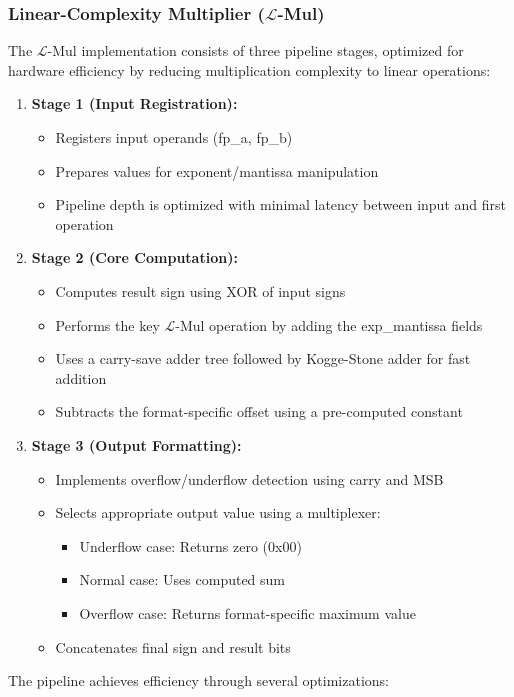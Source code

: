 \documentclass[12pt,letterpaper]{article}
\newcommand{\lmul}{$\mathcal{L}$-Mul\xspace}
\begin{document}
\subsubsection{Linear-Complexity Multiplier (\lmul)}

The \lmul implementation consists of three pipeline stages, optimized for hardware efficiency by reducing multiplication complexity to linear operations:

\begin{enumerate}
    \item \textbf{Stage 1 (Input Registration): }
    \begin{itemize}
        \item Registers input operands (fp\_a, fp\_b)
        \item Prepares values for exponent/mantissa manipulation
        \item Pipeline depth is optimized with minimal latency between input and first operation
    \end{itemize}
    \item \textbf{Stage 2 (Core Computation): }
    \begin{itemize}
        \item Computes result sign using XOR of input signs
        \item Performs the key \lmul operation by adding the exp\_mantissa fields
        \item Uses a carry-save adder tree followed by Kogge-Stone adder for fast addition
        \item Subtracts the format-specific offset using a pre-computed constant
    \end{itemize}
    \item \textbf{Stage 3 (Output Formatting): }
    \begin{itemize}
        \item Implements overflow/underflow detection using carry and MSB
        \item Selects appropriate output value using a multiplexer: 
        \begin{itemize}
            \item Underflow case: Returns zero (0x00)
            \item Normal case: Uses computed sum
            \item Overflow case: Returns format-specific maximum value
        \end{itemize}
        \item Concatenates final sign and result bits
    \end{itemize}
\end{enumerate}
The pipeline achieves efficiency through several optimizations:
\end{document}
